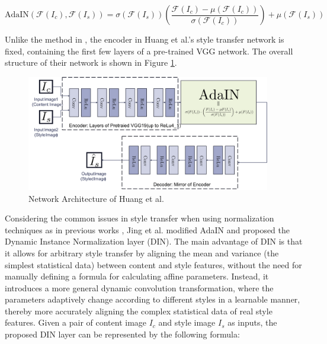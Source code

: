 \documentclass[preprint,12pt]{elsarticle}
\begin{document}
\begin{equation}
    \label{AdaIN_equation}
    \text{AdaIN}(\mathcal{F}(I_c),\mathcal{F}(I_s))=\sigma(\mathcal{F}(I_s))\left(\frac{\mathcal{F}(I_c)-\mu(\mathcal{F}(I_c))}{\sigma(\mathcal{F}(I_c))}\right)+\mu(\mathcal{F}(I_s))
\end{equation}

Unlike the method in \citep{39dumoulin2016learned}, the encoder in Huang et al.'s style transfer network is fixed, containing the first few layers of a pre-trained VGG network. The overall structure of their network is shown in Figure \ref{fig9_Huang}.

\begin{figure}[!htbp]%
    \centering%
    \includegraphics[width=0.95\textwidth]{Figure_9__Network_Architecture_of_Huang_et_al_.pdf}
    \caption{Network Architecture of Huang et al.\citep{04huang2017arbitrary}}\label{fig9_Huang}
\end{figure}

Considering the common issues in style transfer when using normalization techniques as in previous works \citep{04huang2017arbitrary,39dumoulin2016learned}, Jing et al.\citep{41jing2020dynamic} modified AdaIN\citep{04huang2017arbitrary} and proposed the Dynamic Instance Normalization layer (DIN). The main advantage of DIN is that it allows for arbitrary style transfer by aligning the mean and variance (the simplest statistical data) between content and style features, without the need for manually defining a formula for calculating affine parameters. Instead, it introduces a more general dynamic convolution transformation, where the parameters adaptively change according to different styles in a learnable manner, thereby more accurately aligning the complex statistical data of real style features. Given a pair of content image $I_c$ and style image $I_s$ as inputs, the proposed DIN layer can be represented by the following formula:
\end{document}
